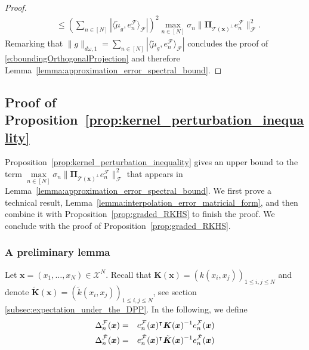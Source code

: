 \documentclass[twoside,11pt]{book}
\numberwithin{theorem}{chapter}
\numberwithin{definition}{chapter}
\numberwithin{proposition}{chapter}
\numberwithin{corollary}{chapter}
\numberwithin{example}{chapter}
\numberwithin{lemma}{chapter}
\numberwithin{assumption}{chapter}
\DeclareMathOperator{\Tran}{\intercal}
\newcommand{\pc}[1]{\textcolor{blue}{#1}}
\begin{document}
\begin{proof}
\begin{align}
    & \leq \left( \sum\limits_{n \in [N]} |\langle \tilde{\mu}_{g}, e_{n}^{\mathcal{F}} \rangle_{\mathcal{F}}| \right)^{2} \max\limits_{n \in [N]}\sigma_{n}  \|\bm{\Pi}_{\mathcal{T}(\bm{x})^{\perp}}e_{n}^{\mathcal{F}}\|_{\mathcal{F}}^{2} .
\end{align}
%
Remarking that
$ \|g \|_{d\omega,1} = \sum\limits_{n \in [N]} |\langle \tilde{\mu}_{g}, e_{n}^{\mathcal{F}} \rangle_{\mathcal{F}}|
$
concludes the proof of \eqref{e:boundingOrthogonalProjection} and therefore Lemma~\ref{lemma:approximation_error_spectral_bound}.
\end{proof}


\subsection{Proof of Proposition~\ref{prop:kernel_perturbation_inequality}}
\label{s:proofOfPerturbationInequality}
Proposition~\ref{prop:kernel_perturbation_inequality} gives an upper bound to the term $\max\limits_{n \in [N]}\sigma_{n}  \|\bm{\Pi}_{\mathcal{T}(\bm{x})^{\perp}}e_{n}^{\mathcal{F}}\|_{\mathcal{F}}^{2}$ that appears in Lemma~\ref{lemma:approximation_error_spectral_bound}.
We first prove a technical result, Lemma~\ref{lemma:interpolation_error_matricial_form}, and then combine it with  Proposition~\ref{prop:graded_RKHS} to finish the proof. We conclude with the proof of Proposition~\ref{prop:graded_RKHS}.

%

\subsubsection{A preliminary lemma}

Let $\bm{x} = (x_{1}, \dots, x_{N}) \in \mathcal{X}^{N}$. Recall that $\bm{K}(\bm{x}) = (k(x_{i},x_{j}))_{1 \leq i,j \leq N}$ and denote $\tilde{\bm{K}}(\bm{x}) = (\tilde{k}(x_{i},x_{j}))_{1 \leq i,j \leq N}$, see section \ref{subsec:expectation_under_the_DPP}.
%
In the following, we define  %
\begin{eqnarray}
  \Delta_n^{\cal F}(\bm{x}) & = & e_{n}^{\mathcal{F}}(\bm{x})^{\Tran}\bm{K}(\bm{x})^{-1}e_{n}^{\mathcal{F}}(\bm{x})\\
  \Delta_n^{\tilde{\cal F}}(\bm{x}) & = & e_{n}^{\tilde{\mathcal{F}}}(\bm{x})^{\Tran}\tilde{\bm{K}}(\bm{x})^{-1}e_{n}^{\tilde{\mathcal{F}}}(\bm{x})
\end{eqnarray}
\end{document}
